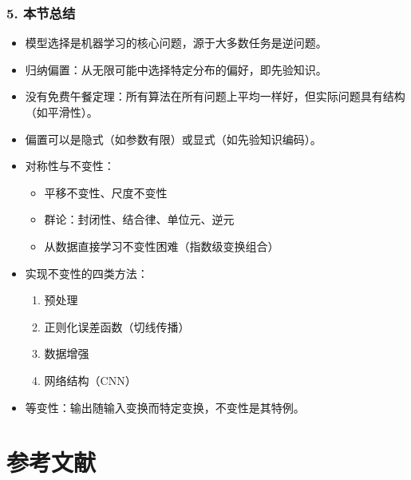 \documentclass[t,aspectratio=169]{beamer} %
\begin{document}
\begin{frame}
    \frametitle{5. 本节总结}
    \begin{itemize}
        \item \alert{模型选择}是机器学习的核心问题，源于大多数任务是\alert{逆问题}。
        \item \alert{归纳偏置}：从无限可能中选择特定分布的偏好，即先验知识。
        \item \alert{没有免费午餐定理}：所有算法在所有问题上平均一样好，但实际问题具有结构（如平滑性）。
        \item 偏置可以是\alert{隐式}（如参数有限）或\alert{显式}（如先验知识编码）。
        \item \alert{对称性与不变性}：
        \begin{itemize}
            \item 平移不变性、尺度不变性
            \item 群论：封闭性、结合律、单位元、逆元
            \item 从数据直接学习不变性困难（指数级变换组合）
        \end{itemize}
        \item \alert{实现不变性的四类方法}：
        \begin{enumerate}
            \item 预处理
            \item 正则化误差函数（切线传播）
            \item 数据增强
            \item 网络结构（CNN）
        \end{enumerate}
        \item \alert{等变性}：输出随输入变换而特定变换，不变性是其特例。
    \end{itemize}
\end{frame}

\section{参考文献}
\end{document}

